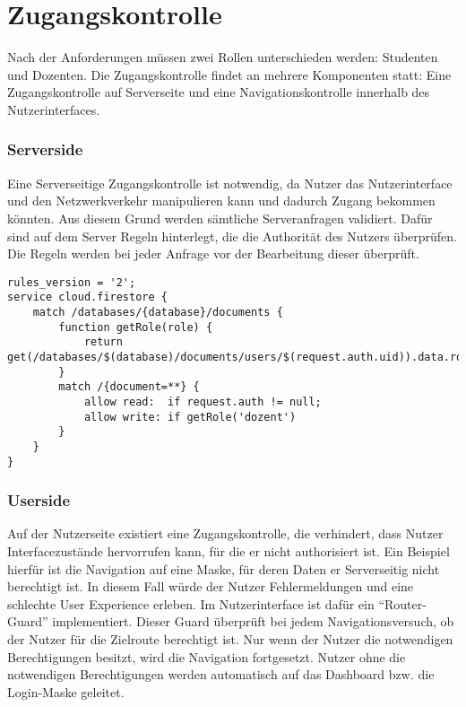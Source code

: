 \section{Zugangskontrolle}
Nach der Anforderungen müssen zwei Rollen unterschieden werden: Studenten und Dozenten.
Die Zugangskontrolle findet an mehrere Komponenten statt: Eine Zugangskontrolle auf Serverseite und eine Navigationskontrolle innerhalb des Nutzerinterfaces.


\subsubsection*{Serverside}
Eine Serverseitige Zugangskontrolle ist notwendig, da Nutzer das Nutzerinterface und den Netzwerkverkehr manipulieren kann und dadurch Zugang bekommen könnten.
Aus diesem Grund werden sämtliche Serveranfragen validiert.
Dafür sind auf dem Server Regeln hinterlegt, die die Authorität des Nutzers überprüfen.
Die Regeln werden bei jeder Anfrage vor der Bearbeitung dieser überprüft.

\begin{lstlisting}[caption={Einfaches Beispiel der Serverside Regeln}, label=lst:firestoreRules]
rules_version = '2';
service cloud.firestore {
    match /databases/{database}/documents {
        function getRole(role) {
            return get(/databases/$(database)/documents/users/$(request.auth.uid)).data.roles[role]
        }
        match /{document=**} {
            allow read:  if request.auth != null;
            allow write: if getRole('dozent')
        }
    }
}\end{lstlisting}


\subsubsection*{Userside}
Auf der Nutzerseite existiert eine Zugangskontrolle, die verhindert, dass Nutzer Interfacezustände hervorrufen kann, für die er nicht authorisiert ist.
Ein Beispiel hierfür ist die Navigation auf eine Maske, für deren Daten er Serverseitig nicht berechtigt ist.
In diesem Fall würde der Nutzer Fehlermeldungen und eine schlechte User Experience erleben.
Im Nutzerinterface ist dafür ein \enquote{Router-Guard} implementiert.
Dieser Guard überprüft bei jedem Navigationsversuch, ob der Nutzer für die Zielroute berechtigt ist.
Nur wenn der Nutzer die notwendigen Berechtigungen besitzt, wird die Navigation fortgesetzt.
Nutzer ohne die notwendigen Berechtigungen werden automatisch auf das Dashboard bzw. die Login-Maske geleitet.







